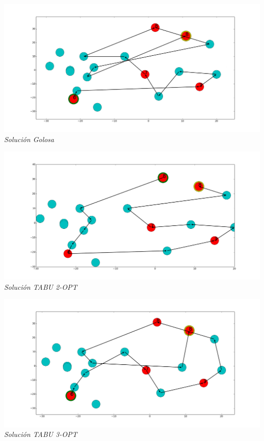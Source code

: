 \vspace*{0.3cm} \vspace*{0.3cm}
  \begin{center}
 \includegraphics[scale=0.3]{./EJ4/fam8goloso.png}\\
 {            \textit{Soluci\'on Golosa}}
  \end{center}
  \vspace*{0.3cm}

\vspace*{0.3cm} \vspace*{0.3cm}
  \begin{center}
 \includegraphics[scale=0.3]{./EJ4/fam82opt.png}\\
 {            \textit{Soluci\'on TABU 2-OPT}}
  \end{center}
  \vspace*{0.3cm}

\vspace*{0.3cm} \vspace*{0.3cm}
  \begin{center}
 \includegraphics[scale=0.3]{./EJ4/fam83opt.png}\\
 {            \textit{Soluci\'on TABU 3-OPT}}
  \end{center}
  \vspace*{0.3cm}

